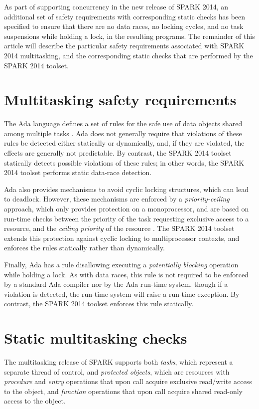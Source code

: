 \documentclass[conference,compsoc]{IEEEtran}
\begin{document}
As part of supporting concurrency in the new release of SPARK 2014, an
additional set of safety requirements with corresponding static checks has
been specified to ensure that there are no data races, no locking cycles,
and no task suspensions while holding a lock, in the resulting programs.
The remainder of this article will describe the particular safety
requirements associated with SPARK 2014 multitasking, and the corresponding
static checks that are performed by the SPARK 2014 toolset.

\section{Multitasking safety requirements}
The Ada language defines a set of rules for the safe use of data objects
shared among multiple tasks \cite{lrm}. Ada does not generally require that
violations of these rules be detected either statically or dynamically,
and, if they are violated, the effects are generally not predictable. By
contrast, the SPARK 2014 toolset statically detects possible violations of
these rules; in other words, the SPARK 2014 toolset performs static
data-race detection.

Ada also provides mechanisms to avoid cyclic locking structures, which can
lead to deadlock. However, these mechanisms are enforced by a
\emph{priority-ceiling} approach, which only provides protection on a
monoprocessor, and are based on run-time checks between the priority of the
task requesting exclusive access to a resource, and the \emph{ceiling
  priority} of the resource \cite{mccormick2011building}. The SPARK 2014
toolset extends this protection against cyclic locking to multiprocessor
contexts, and enforces the rules statically rather than dynamically.

Finally, Ada has a rule disallowing executing a \emph{potentially blocking}
operation while holding a lock. As with data races, this rule is not
required to be enforced by a standard Ada compiler nor by the Ada run-time
system, though if a violation is detected, the run-time system will raise a
run-time exception. By contrast, the SPARK 2014 toolset enforces this rule
statically.

\section{Static multitasking checks}
The multitasking release of SPARK supports both \emph{tasks}, which
represent a separate thread of control, and \emph{protected objects}, which
are resources with \emph{procedure} and \emph{entry} operations that upon
call acquire exclusive read/write access to the object, and \emph{function}
operations that upon call acquire shared read-only access to the object.
\end{document}
